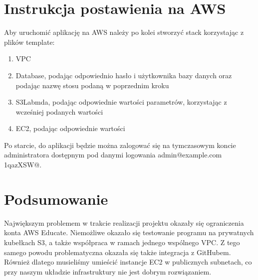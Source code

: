\documentclass[12pt,a4paper]{article}
\begin{document}
    \section{Instrukcja postawienia na AWS}
        Aby uruchomić aplikację na AWS należy po kolei stworzyć stack korzystając z plików template:
        \begin{enumerate}
            \item VPC
            \item Database, podając odpowiednio hasło i użytkownika bazy danych oraz podając nazwę stosu podaną w poprzednim kroku
            \item S3Labmda, podając odpowiednie wartości parametrów, korzystając z wcześniej podanych wartości
            \item EC2, podając odpowiednie wartości
        \end{enumerate}
        Po starcie, do aplikacji będzie można zalogować się na tymczasowym koncie administratora dostępnym pod danymi logowania admin@example.com 1qazXSW@.
    \section{Podsumowanie}
        Największym problemem w trakcie realizacji projektu okazały się ograniczenia konta AWS Educate.
        Niemożliwe okazało się testowanie programu na prywatnych kubełkach S3, a także współpraca w ramach jednego wspólnego VPC.
        Z tego samego powodu problematyczna okazała się także integracja z GitHubem.
        Również dlatego musieliśmy umieścić instancje EC2 w publicznych subnetach, co przy naszym układzie infrastruktury nie jest dobrym rozwiązaniem.
\end{document}
